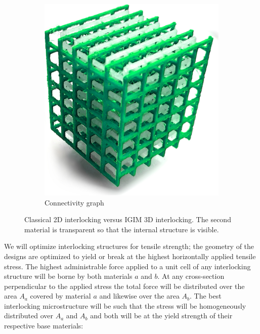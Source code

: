 \begin{figure}
\begin{subfigure}[B]{.29\columnwidth}
		\includegraphics[height=\figheight]{sources/method/connectivity_lattice.jpg}
		\caption{Connectivity graph}
		\label{fig:connectivity_graph}
	\end{subfigure}
	\caption{Classical 2D interlocking versus IGIM 3D interlocking. The second material is transparent so that the internal structure is visible.}
	\label{fig:basic_structure}
\end{figure}




We will optimize interlocking structures for tensile strength;
the geometry of the designs are optimized to yield or break at the highest horizontally applied tensile stress.
The highest administrable force applied to a unit cell of any interlocking structure will be borne by both materials $a$ and $b$.
At any cross-section perpendicular to the applied stress the total force will be distributed over the area $A_a$ covered by material $a$ and likewise over the area $A_b$.
The best interlocking microstructure will be such that the stress will be homogeneously distributed over $A_a$ and $A_b$ and both will be at the yield strength of their respective base materials:

